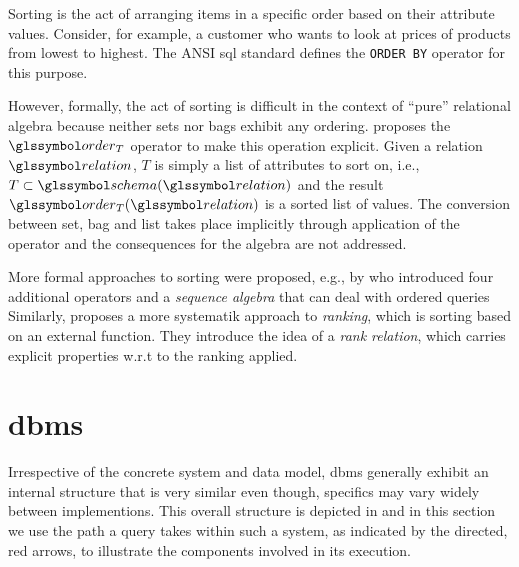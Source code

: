 Sorting is the act of arranging items in a specific order based on their attribute values. Consider, for example, a customer who wants to look at prices of products from lowest to highest. The ANSI \acrshort{sql} standard \cite{XOpen:1996SQL} defines the \texttt{ORDER BY} operator for this purpose.

However, formally, the act of sorting is difficult in the context of ``pure'' relational algebra because neither sets nor bags exhibit any ordering. \cite{Garcia:2009Database} proposes the $\order_T$ operator to make this operation explicit. Given a relation $\relation$, $T$ is simply a list of attributes to sort on, i.e., $T \subset \schema(\relation)$ and the result $\order_T (\relation)$ is a sorted list of values. The conversion between set, bag and list takes place implicitly through application of the operator and the consequences for the algebra are not addressed.

More formal approaches to sorting were proposed, e.g., by \cite{Ramakrsihnan:1998SRQL} who introduced four additional operators and a \emph{sequence algebra} that can deal with ordered queries Similarly, \cite{Chengkai:2005RankSQL} proposes a more systematik approach to \emph{ranking}, which is sorting based on an external function. They introduce the idea of a \emph{rank relation}, which carries explicit properties w.r.t to the ranking applied.

\section{\acrfull{dbms}}
Irrespective of the concrete system and data model, \acrshort{dbms} generally exhibit an internal structure that is very similar \cite{Petrov:2019Database,Hellerstein:2007Architecture} even though, specifics may vary widely between implementions. This overall structure is depicted in  and in this section we use the path a query takes within such a system, as indicated by the directed, red arrows, to illustrate the components involved in its execution.

